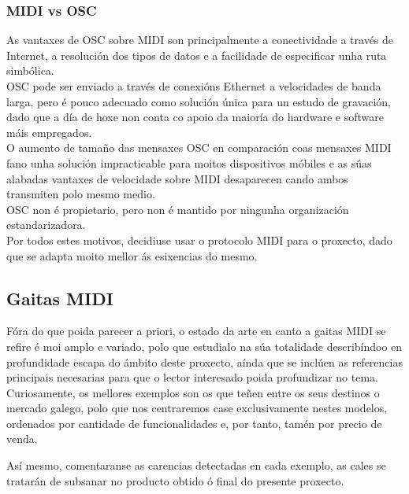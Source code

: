   \subsubsection{MIDI vs OSC}

  As vantaxes de OSC sobre MIDI son principalmente a conectividade a través de
  Internet, a resolución dos tipos de datos e a facilidade de especificar unha
  ruta simbólica. \\

  OSC pode ser enviado a través de conexións Ethernet a velocidades de banda
  larga, pero é pouco adecuado como solución única para un estudo de gravación,
  dado que a día de hoxe non conta co apoio da maioría do hardware e software
  máis empregados. \\

  O aumento de tamaño das mensaxes OSC en comparación coas mensaxes MIDI fano
  unha solución impracticable para moitos dispositivos móbiles e as súas
  alabadas vantaxes de velocidade sobre MIDI desaparecen cando ambos transmiten
  polo mesmo medio. \\

  OSC non é propietario, pero non é mantido por ningunha organización
  estandarizadora. \\

  Por todos estes motivos, decidiuse usar o protocolo MIDI para o proxecto,
  dado que se adapta moito mellor ás esixencias do mesmo.

 \subsection{Gaitas MIDI}

 Fóra do que poida parecer a priori, o estado da arte en canto a gaitas MIDI se
 refire é moi amplo e variado, polo que estudialo na súa totalidade
 describíndoo en profundidade escapa do ámbito deste proxecto, aínda que se
 inclúen as referencias principais necesarias para que o lector interesado
 poida profundizar no tema. \\

 Curiosamente, os mellores exemplos son os que teñen entre os seus destinos o
 mercado galego, polo que nos centraremos case exclusivamente nestes modelos,
 ordenados por cantidade de funcionalidades e, por tanto, tamén por precio de
 venda.

 Así mesmo, comentaranse as carencias detectadas en cada exemplo, as cales se
 tratarán de subsanar no producto obtido ó final do presente proxecto.

